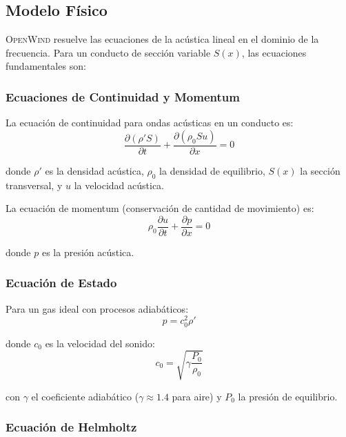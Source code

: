 \documentclass[12pt,a4paper,twocolumn]{article}
\newcommand{\openwind}{\textsc{OpenWind}}
\begin{document}
\subsection{Modelo Físico}

\openwind{} resuelve las ecuaciones de la acústica lineal en el dominio de la frecuencia. Para un conducto de sección variable $S(x)$, las ecuaciones fundamentales son:

\subsubsection{Ecuaciones de Continuidad y Momentum}

La ecuación de continuidad para ondas acústicas en un conducto es:
\begin{equation}
\frac{\partial (\rho' S)}{\partial t} + \frac{\partial (\rho_0 S u)}{\partial x} = 0
\end{equation}

donde $\rho'$ es la densidad acústica, $\rho_0$ la densidad de equilibrio, $S(x)$ la sección transversal, y $u$ la velocidad acústica.

La ecuación de momentum (conservación de cantidad de movimiento) es:
\begin{equation}
\rho_0 \frac{\partial u}{\partial t} + \frac{\partial p}{\partial x} = 0
\end{equation}

donde $p$ es la presión acústica.

\subsubsection{Ecuación de Estado}

Para un gas ideal con procesos adiabáticos:
\begin{equation}
p = c_0^2 \rho'
\end{equation}

donde $c_0$ es la velocidad del sonido:
\begin{equation}
c_0 = \sqrt{\gamma \frac{P_0}{\rho_0}}
\end{equation}

con $\gamma$ el coeficiente adiabático ($\gamma \approx 1.4$ para aire) y $P_0$ la presión de equilibrio.

\subsubsection{Ecuación de Helmholtz}
\end{document}
